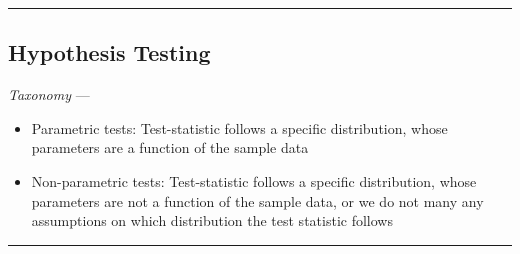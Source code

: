 {\color{black}\hrule height 0.001mm}

\subsection*{Hypothesis Testing}
\emph{Taxonomy} ---
\begin{itemize}
    \item Parametric tests:  Test-statistic follows a specific distribution, whose parameters are a function of the sample data
    \item Non-parametric tests: Test-statistic follows a specific distribution, whose parameters are not a function of the sample data, or we do not many any assumptions on which distribution the test statistic follows 
\end{itemize}

{\color{lightgray}\hrule height 0.001mm}

